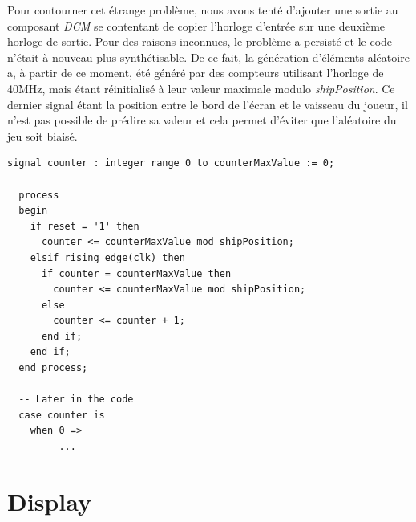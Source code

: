 \documentclass[french]{nakrule}
\begin{document}
Pour contourner cet étrange problème, nous avons tenté d'ajouter une sortie au
composant \emph{DCM} se contentant de copier l'horloge d'entrée sur une deuxième
horloge de sortie. Pour des raisons inconnues, le problème a persisté et le code
n'était à nouveau plus synthétisable. De ce fait, la génération d'éléments
aléatoire a, à partir de ce moment, été généré par des compteurs utilisant
l'horloge de 40MHz, mais étant réinitialisé à leur valeur maximale modulo
\emph{shipPosition}. Ce dernier signal étant la position entre le bord de
l'écran et le vaisseau du joueur, il n'est pas possible de prédire sa valeur et
cela permet d'éviter que l'aléatoire du jeu soit biaisé.

\begin{lstlisting}[style=vhdl, caption=Génération d'aléatoire]
  signal counter : integer range 0 to counterMaxValue := 0;
  
  process
  begin
    if reset = '1' then
      counter <= counterMaxValue mod shipPosition;
    elsif rising_edge(clk) then
      if counter = counterMaxValue then
        counter <= counterMaxValue mod shipPosition;
      else
        counter <= counter + 1;
      end if;
    end if;
  end process;

  -- Later in the code
  case counter is
    when 0 =>
      -- ...
\end{lstlisting}

\clearpage

\section{Display}
\label{sec:display}
\end{document}
